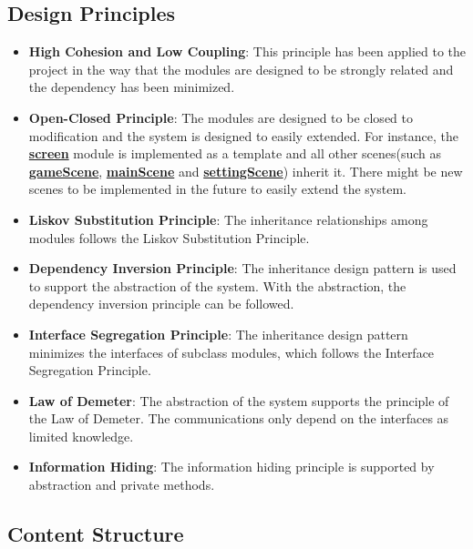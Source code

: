 \documentclass[12pt, titlepage]{article}
\begin{document}
\subsection{Design Principles}
\begin{itemize}
    \item \textbf{High Cohesion and Low Coupling}: This principle has been applied to the project in the way that the modules are designed to be strongly related and the dependency has been minimized.
    \item \textbf{Open-Closed Principle}: The modules are designed to be closed to modification and the system is designed to easily extended. For instance, the \href{https://gitlab.cas.mcmaster.ca/wangs132/minecraft/-/blob/master/src/screen.py}{\bf screen} module is implemented as a template and all other scenes(such as \href{https://gitlab.cas.mcmaster.ca/wangs132/minecraft/-/blob/master/src/gameScene.py}{\bf gameScene}, \href{https://gitlab.cas.mcmaster.ca/wangs132/minecraft/-/blob/master/src/mainScene.py}{\bf mainScene} and \href{https://gitlab.cas.mcmaster.ca/wangs132/minecraft/-/blob/master/src/settingScene.py}{\bf settingScene}) inherit it. There might be new scenes to be implemented in the future to easily extend the system.
    \item \textbf{Liskov Substitution Principle}: The inheritance relationships among modules follows the Liskov Substitution Principle.
    \item \textbf{Dependency Inversion Principle}: The inheritance design pattern is used to support the abstraction of the system. With the abstraction, the dependency inversion principle can be followed.
    \item \textbf{Interface Segregation Principle}: The inheritance design pattern minimizes the interfaces of subclass modules, which follows the Interface Segregation Principle.
    \item \textbf{Law of Demeter}: The abstraction of the system supports the principle of the Law of Demeter. The communications only depend on the interfaces as limited knowledge.
    \item \textbf{Information Hiding}: The information hiding principle is supported by abstraction and private methods.
\end{itemize}

\subsection{Content Structure}
\end{document}
